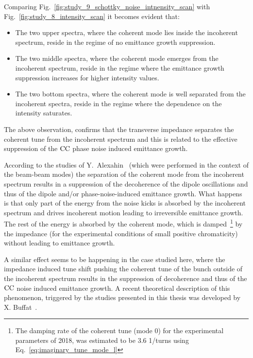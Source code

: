 Comparing Fig.~\ref{fig:study_9_schottky_noise_intnensity_scan} with Fig.~\ref{fig:study_8_intensity_scan} it becomes evident that:
\begin{itemize}
    \item The two upper spectra, where the coherent mode lies inside the incoherent spectrum, reside in the regime of no emittance growth suppression.
    \item The two middle spectra, where the coherent mode emerges from the incoherent spectrum, reside in the regime where the emittance growth suppression increases for higher intensity values.
    \item The two bottom spectra, where the coherent mode is well separated from the incoherent spectra, reside in the regime where the dependence on the intensity saturates.
\end{itemize}

The above observation, confirms that the transverse impedance separates the coherent tune from the incoherent spectrum and this is related to the effective suppression of the ${\mathrm{CC}}$ phase noise induced emittance growth.

According to the studies of Y.~Alexahin~\cite{Alexahin:314169} (which were performed in the context of the beam-beam modes) the separation of the coherent mode from the incoherent spectrum results in a suppression of the decoherence of the dipole oscillations and thus of the dipole and/or phase-noise-induced emittance growth. What happens is that only part of the energy from the noise kicks is absorbed by the incoherent spectrum and drives incoherent motion leading to irreversible emittance growth. The rest of the energy is absorbed by the coherent mode, which is damped~\footnote{The damping rate of the coherent tune (mode 0) for the experimental parameters of 2018, was estimated to be 3.6 1/turns using Eq.~\eqref{eq:imaginary_tune_mode_l}} by the impedance (for the experimental conditions of small positive chromaticity) without leading to emittance growth.

A similar effect seems to be happening in the case studied here, where the impedance induced tune shift pushing the coherent tune of the bunch outside of the incoherent spectrum results in the suppression of decoherence and thus of the ${\mathrm{CC}}$ noise induced emittance growth. A recent theoretical description of this phenomenon, triggered by the studies presented in this thesis was developed by X. Buffat~\cite{Buffat:2022dac, van_kamper_presentation_xavier_theory}.


